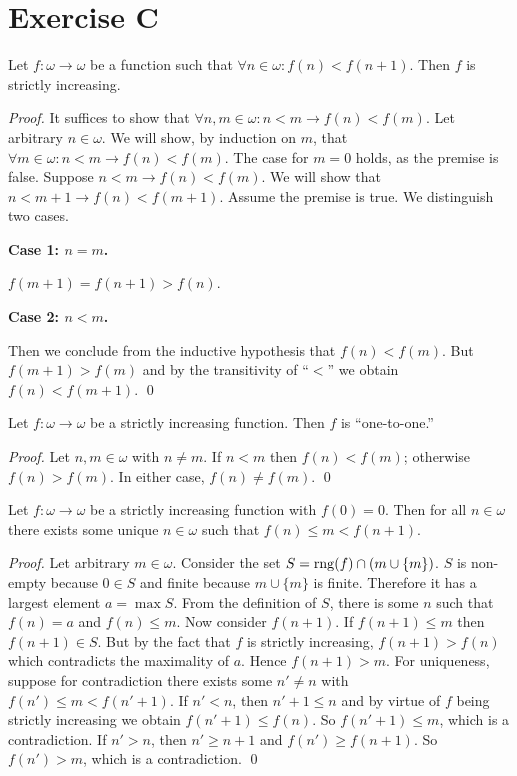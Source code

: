 \documentclass[11pt]{llncs}
\begin{document}
\section*{Exercise C}

\begin{lemma}\label{lem:increasing-functions}
  Let $f: \omega \longrightarrow \omega$ be a function such that
  $\forall n \in \omega: f(n) < f(n + 1)$. Then $f$ is strictly increasing.
\end{lemma}
\begin{proof}
  It suffices to show that
  $\forall n, m \in \omega: n < m \rightarrow f(n) < f(m)$.
  Let arbitrary $n \in \omega$. We will show, by induction on $m$, that
  $\forall m \in \omega: n < m \rightarrow f(n) < f(m)$. The case for $m = 0$
  holds, as the premise is false. Suppose $n < m \rightarrow f(n) < f(m)$.
  We will show that $n < m + 1 \rightarrow f(n) < f(m + 1)$.
  Assume the premise is true. We distinguish two cases.

  \textbf{Case 1: $n = m$.}

  $f(m + 1) = f(n + 1) > f(n)$.

  \textbf{Case 2: $n < m$.}

  Then we conclude from the inductive hypothesis that $f(n) < f(m)$.
  But $f(m + 1) > f(m)$ and by the transitivity of ``$<$'' we
  obtain $f(n) < f(m + 1)$.
  \qed
\end{proof}
\begin{lemma}\label{lem:inc-one-to-one}
  Let $f: \omega \longrightarrow \omega$ be a strictly increasing function.
  Then $f$ is ``one-to-one.''
\end{lemma}
\begin{proof}
  Let $n, m \in \omega$ with $n \neq m$. If $n < m$ then $f(n) < f(m)$;
  otherwise $f(n) > f(m)$. In either case, $f(n) \neq f(m)$.
  \qed
\end{proof}

\begin{lemma}\label{lem:function-squeeze}
  Let $f: \omega \longrightarrow \omega$ be a strictly increasing function with
  $f(0) = 0$. Then for all $n \in \omega$ there exists some unique $n \in \omega$ such
  that $f(n) \leq m < f(n + 1)$.
\end{lemma}
\begin{proof}
  Let arbitrary $m \in \omega$.
  Consider the set $S = \mathrm{rng}(f) \cap (m \cup \{m\})$. $S$ is non-empty because
  $0 \in S$ and finite because $m \cup \{m\}$ is finite. Therefore it has a
  largest element
  $a = \max{S}$. From the definition of $S$, there is some $n$ such that
  $f(n) = a$ and $f(n) \leq m$. Now consider $f(n + 1)$. If $f(n + 1) \leq m$
  then $f(n + 1) \in S$. But by the fact that $f$ is strictly increasing,
  $f(n + 1) > f(n)$ which contradicts the maximality of $a$. Hence
  $f(n + 1) > m$.
  For uniqueness, suppose for contradiction there exists some $n' \neq n$ with
  $f(n') \leq m < f(n' + 1)$. If $n' < n$, then $n' + 1 \leq n$ and by virtue of
  $f$ being strictly increasing we obtain $f(n' + 1) \leq f(n)$. So
  $f(n' + 1) \leq m$, which is a contradiction. If $n' > n$, then
  $n' \geq n + 1$ and $f(n') \geq f(n + 1)$. So $f(n') > m$, which is a
  contradiction.
  \qed
\end{proof}
\end{document}
